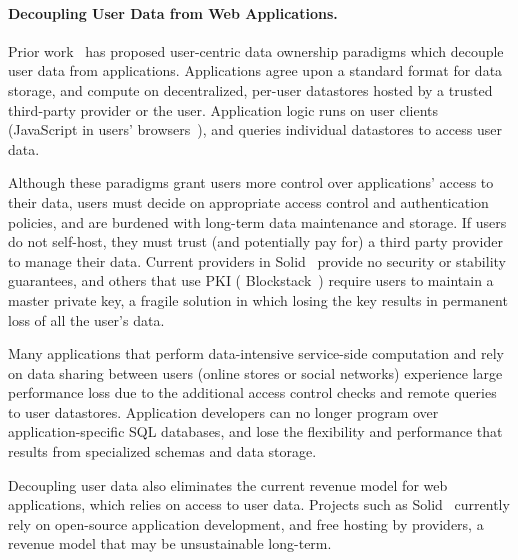 

\paragraph{Decoupling User Data from Web Applications.} 
Prior work~\cite{diy, solid, amber, oort, w5, blockstack, bstore, databox} has proposed user-centric data
ownership paradigms which decouple user data from applications. Applications agree upon a standard
format for data storage, and compute on decentralized, per-user datastores hosted by a trusted
third-party provider or the user. Application logic runs on user clients (\eg JavaScript in users'
browsers~\cite{solid, blockstack, bstore}), and queries individual datastores to access user data.

Although these paradigms grant users more control over applications' access to their data, users
must decide on appropriate access control and authentication policies, and are burdened with
long-term data maintenance and storage. If users do not self-host, they must trust (and potentially
pay for) a third party provider to manage their data. Current providers in Solid~\cite{solid}
provide no security or stability guarantees, and others that use PKI (\eg
Blockstack~\cite{blockstack}) require users to maintain a master private key, a fragile solution in
which losing the key results in permanent loss of all the user's data.

Many applications that perform data-intensive service-side computation and rely on data sharing
between users (\eg online stores or social networks) experience large performance loss due to the
additional access control checks and remote queries to user datastores. Application developers can
no longer program over application-specific SQL databases, and lose the flexibility and performance
that results from specialized schemas and data storage.  

Decoupling user data also eliminates the current revenue model for web applications, which relies on
access to user data. Projects such as Solid~\cite{solid} currently rely on open-source application
development, and free hosting by providers, a revenue model that may be unsustainable long-term.

